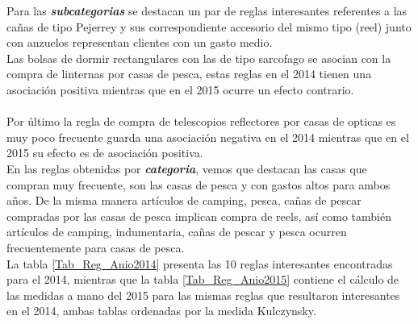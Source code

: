 \documentclass[]{article}
\begin{document}
	Para las \textbf{\textit{subcategorias}} se destacan un par de reglas interesantes referentes a las cañas de tipo Pejerrey y sus correspondiente accesorio del mismo tipo (reel) junto con anzuelos representan clientes con un gasto medio.\\ 
	
	Las bolsas de dormir rectangulares con las de tipo sarcofago se asocian con la compra de linternas por casas de pesca, estas reglas en el 2014 tienen una asociación positiva mientras que en el 2015 ocurre un efecto contrario.\\\\ 
	
	Por último la regla de compra de  telescopios reflectores  por casas de opticas es muy poco frecuente guarda una asociación negativa en el 2014  mientras que en el 2015 su efecto es de asociación positiva.\\
	
	En las reglas obtenidas por \textit{\textbf{categoria}}, vemos que destacan las casas que compran muy frecuente, son las casas de pesca y con gastos altos para ambos años. De la misma manera artículos de camping, pesca, cañas de pescar compradas por las casas de pesca implican compra de reels, así como también artículos de camping, indumentaria, cañas de pescar y pesca ocurren frecuentemente para casas de pesca.\\
	
	La tabla \ref{Tab_Reg_Anio2014} presenta las 10 reglas interesantes encontradas para el 2014, mientras que la tabla \ref{Tab_Reg_Anio2015} contiene el cálculo de las medidas a mano del 2015 para las mismas reglas que resultaron interesantes en el 2014, ambas tablas ordenadas por la medida Kulczynsky.
	
\end{document}
